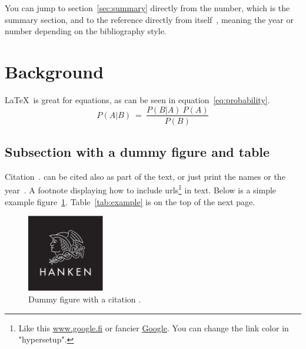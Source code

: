\documentclass[12pt, a4paper, oneside]{article}
\begin{document}
You can jump to section~\ref{sec:summary} directly from the number, which is the summary section,
and to the reference directly from itself~\citep{vet2007ophthal},
meaning the year or number depending on the bibliography style.

\clearpage


\section{Background} \label{sec:background}

\blindtext

\LaTeX~is great for equations, as can be seen in equation~\ref{eq:probability}.
\begin{equation} \label{eq:probability}
    P(A | B) \ = \ \frac{P(B | A) \ P(A)}{P(B)}
\end{equation}

\subsection{Subsection with a dummy figure and table} \label{subsec:subsection-with-a-dummy-figure-and-table}

Citation~\citep{hermanson2020anatomy, petersen2005advances}.
\citet{petersen2005advances} can be cited also as part of the text,
or just print the names \citeauthor{petersen2005advances} or the year~\citeyear{petersen2005advances}.
A footnote displaying how to include urls\footnote{Like this \url{www.google.fi} or fancier \href{www.google.fi}{Google}.
    You can change the link color in "hypersetup".} in text.
Below is a simple example figure~\ref{fig:figure}.
Table~\ref{tab:example} is on the top of the next page.

\begin{figure}[h]
    \centering
    \includegraphics[width=0.3\textwidth]{hanken_logo_platta}
    \caption[Dummy figure]{Dummy figure with a citation \citep{mellersh2014genetics}.}
    \label{fig:figure}
\end{figure}
\end{document}
